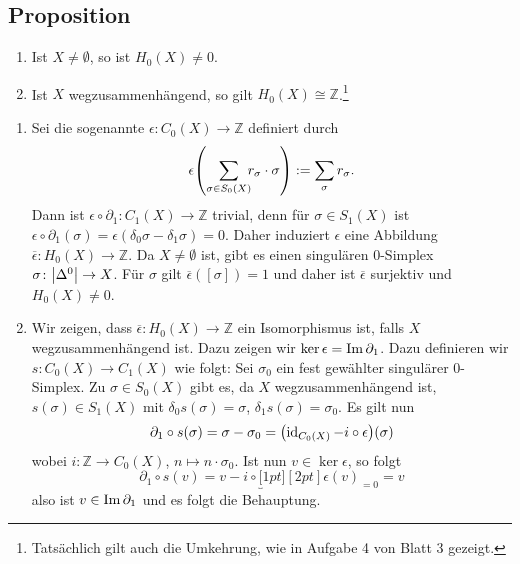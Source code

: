 \subsection[Proposition: Eigenschaften von $H_0(X)$ für $X \not= \emptyset$ und $X$ wegzusammenhängend]{Proposition} %
\label{sub:510}
\begin{enumerate}[1)]
	\item Ist $X \not= \emptyset$, so ist $H_0(X) \not=0$.
	\item Ist $X$ wegzusammenhängend, so gilt $H_0(X) \cong \mathds{Z}$.\footnote{Tatsächlich gilt auch die Umkehrung, wie in Aufgabe 4 von Blatt 3 gezeigt.}
\end{enumerate}
\begin{enumerate}[1)]
	\item Sei die sogenannte  $\epsilon \colon C_0(X) \to \mathds{Z}$ definiert durch 
	\[
		\epsilon \enbrace*{\sum_{\sigma \in S_0(X)} \hspace{-1ex} r_\sigma \cdot \sigma } := \sum_\sigma r_\sigma.
	\]
	Dann ist $\epsilon \circ \partial_1 \colon C_1(X) \to \mathds{Z}$ trivial, denn für $\sigma \in S_1(X)$ ist 
	$\epsilon \circ \partial_1(\sigma)= \epsilon(\delta_0 \sigma - \delta_1 \sigma) = 0$.
	Daher induziert $\epsilon$ eine Abbildung 
	$\overline{\epsilon} \colon H_0(X) \to \mathds{Z}$. Da $X \not= \emptyset$ ist, gibt es einen singulären $0$-Simplex $\sigma \colon \abs*{\Delta^0} \to X$. Für $\sigma$ gilt 
	$\overline{\epsilon}( [\sigma])=1$ und daher ist $\overline{\epsilon}$ surjektiv und $H_0(X) \not= 0$.
	\item Wir zeigen, dass $\overline{\epsilon} \colon H_0(X) \to \mathds{Z}$ ein Isomorphismus ist, falls $X$ wegzusammenhängend ist. Dazu zeigen wir 
	$\ker \epsilon = \operatorname{Im} \partial_1$. Dazu definieren wir $s \colon C_0(X) \to C_1(X)$ wie folgt: Sei $\sigma_0$ ein fest gewählter singulärer $0$-Simplex.
	Zu $\sigma \in S_0(X)$ gibt es, da $X$ wegzusammenhängend ist, $s(\sigma) \in S_1(X)$ mit $\delta_0 s(\sigma)= \sigma$, $\delta_1 s(\sigma)= \sigma_0$.
	Es gilt nun 
	\begin{align*}
		\partial_1 \circ s(\sigma) = \sigma - \sigma_0 = \enbrace*{\id_{C_0(X)} - i \circ \epsilon }(\sigma)
	\end{align*}
	wobei $i \colon \mathds{Z} \to C_0(X)$, $n \mapsto n \cdot \sigma_0$. Ist nun $v \in \ker \epsilon$, so folgt 
	\[
		\partial_1 \circ s(v)= v- i \circ \underbracket[1pt][2pt]{\epsilon(v)}_{=0} = v
	\]
	also ist $v \in \operatorname{Im} \partial_1$ und es folgt die Behauptung. \bewende
	

\end{enumerate}
